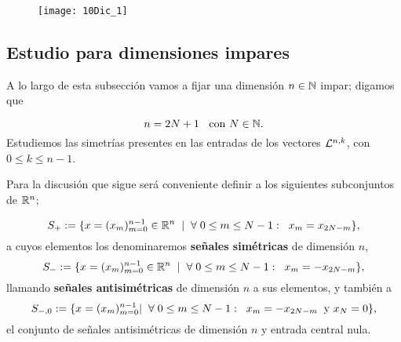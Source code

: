 \begin{figure}[H]
	\centering
	\texttt{[image: 10Dic\_1]} 
\end{figure}	


\subsection{Estudio para dimensiones impares}
A lo largo de esta subsección vamos a fijar
una dimensión 
$n \in \mathbb{N}$ impar; digamos que

\begin{equation}
\label{eq1: 19En}
n=2N +1 \hspace{0.2cm} \text{ con } N \in \mathbb{N}.
\end{equation}
Estudiemos las simetrías presentes en las entradas
de los vectores $\mathcal{L}^{n,k}$, con $0 \leq k \leq n-1$.

Para la discusión que sigue será conveniente definir
a los siguientes subconjuntos de $\mathbb{R}^{n}$;

\begin{equation}
\label{eq0: 5Dic}
S_{+}:= \{ x=(x_{m})_{m=0}^{n-1} \in \mathbb{R}^{n} \hspace{0.2cm} 
| \hspace{0.2cm} \forall  
\hspace{0.1cm}
0 \leq m \leq N-1 : \hspace{0.2cm} x_{m}= x_{2N-m}\},
\end{equation}
a cuyos elementos los denominaremos
\textbf{señales simétricas} de dimensión $n$,
\begin{equation}
\label{eq1: 5Dic}
S_{-}:= \{ x=(x_{m})_{m=0}^{n-1}  \in \mathbb{R}^{n}
\hspace{0.2cm} |
\hspace{0.2cm} \forall  
\hspace{0.1cm}
0 \leq m \leq N-1 : \hspace{0.2cm} x_{m}= -x_{2N-m}\},
\end{equation}
llamando \textbf{señales antisimétricas} de dimensión $n$
a sus elementos, 
y también a
\begin{equation}
\label{eq2: 19En}
S_{-,0}:= \{ x=(x_{m})_{m=0}^{n-1}| \hspace{0.2cm} \forall  
\hspace{0.1cm}
0 \leq m \leq N-1 : \hspace{0.2cm} x_{m}= -x_{2N-m} 
\hspace{0.2cm} \text{y } x_{N}=0
\},
\end{equation}
el conjunto de señales antisimétricas de dimensión $n$
y entrada central nula.

